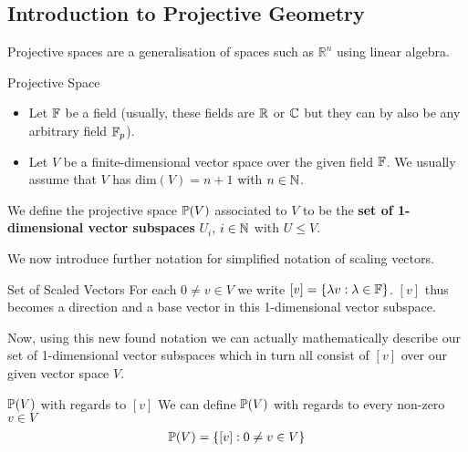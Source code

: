 \subsection{Introduction to Projective Geometry}

Projective spaces are a generalisation of spaces such as $\mathbb{R}^n$ using linear algebra. \\




\begin{definitionBox}{Projective Space}    
    \begin{itemize}
        \item Let $\mathbb{F}$ be a field (usually, these fields are $\mathbb{R}$ or $\mathbb{C}$ but they can by also be any arbitrary field $\mathbb{F}_p$).
        \item Let $V$ be a finite-dimensional vector space over the given field $\mathbb{F}$. We usually assume that $V$ has $\mathrm{dim}(V) = n +1$ with $n \in \mathbb{N}$.
    \end{itemize}  

    We define the projective space $\mathbb{P}(V)$ associated to $V$ to be the \textbf{set of 1-dimensional vector subspaces} $U_i$, $i \in \mathbb{N}$ with $U \leq V$.
\end{definitionBox}
\vspace{0.5cm}



We now introduce further notation for simplified notation of scaling vectors.

\begin{definitionBox}{Set of Scaled Vectors}
    For each $0 \neq v \in V$ we write $[v] = \{\lambda v: \lambda \in \mathbb{F}\}$.
    $[v]$ thus becomes a direction and a base vector in this 1-dimensional vector subspace.
\end{definitionBox}
\vspace{0.5cm}



Now, using this new found notation we can actually mathematically describe our set of 1-dimensional vector subspaces which in turn all consist of $[v]$ over our given vector space $V$.

\begin{definitionBox}{$\mathbb{P}(V)$ with regards to $[v]$}
    We can define $\mathbb{P}(V)$ with regards to every non-zero $v \in V$
    \begin{gather*}
        \mathbb{P}(V) = \{[v]: 0 \neq v \in V\}
    \end{gather*}
\end{definitionBox}

